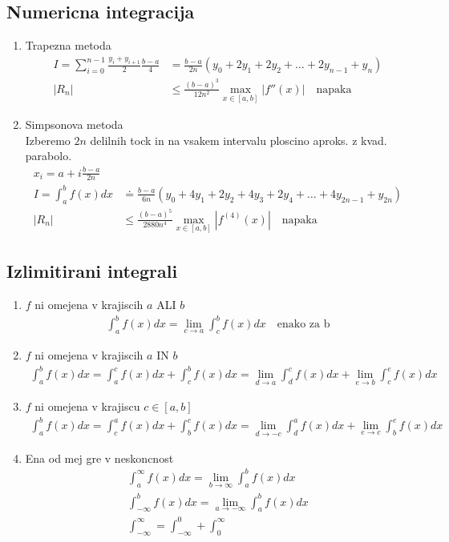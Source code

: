 \documentclass[a4paper,oneside,8pt]{extarticle}
\theoremstyle{definition}
\newcommand\abs[1]{\left|#1\right|}
\begin{document}
\begin{multicols}{2}
	\subsection*{Numericna integracija}
	\begin{enumerate}
		\item Trapezna metoda
		\begin{align*}
			I = \sum_{i=0}^{n-1} \frac{y_i +y_{i+1}}{2} \frac{b - a}{4} &= \frac{b-a}{2n} (y_0 + 2y_1 + 2y_2 + \dots + 2y_{n-1} + y_{n})\\
			\abs{R_n} &\leq \frac{(b-a)^3}{12n^2} \max_{x \in [a,b]} \abs{f''(x)} \quad \text{napaka}
		\end{align*}
		\item Simpsonova metoda\\
		Izberemo $2n$ delilnih tock in na vsakem intervalu ploscino aproks. z kvad. parabolo.
		\begin{align*}
			x_i = a + i\frac{b-a}{2n}\\
			I = \int_{a}^{b} f(x)dx &\doteq \frac{b-a}{6n} (y_0 + 4y_1 + 2y_2 + 4y_3 + 2y_4 + \dots + 4y_{2n-1} + y_{2n})\\
			\abs{R_n} &\leq \frac{(b-a)^5}{2880n^4} \max_{x \in [a,b]} \abs{f^{(4)}(x)} \quad \text{napaka}
		\end{align*}
	\end{enumerate}
%
	\subsection*{Izlimitirani integrali}
	\begin{enumerate}
		\item $f$ ni omejena v krajiscih $a$ ALI $b$
		\begin{align*}
			\int_{a}^{b} f(x)dx = \lim_{c \to a} \int_{c}^{b} f(x)dx \quad \text{enako za b}
		\end{align*}
		\item $f$ ni omejena v krajiscih $a$ IN $b$
		\begin{align*}
			\int_{a}^{b} f(x)dx = \int_{a}^{c} f(x)dx + \int_{c}^{b} f(x)dx = \lim_{d\to a} \int_{d}^{c} f(x)dx + \lim_{e\to b} \int_{c}^{e} f(x)dx  
		\end{align*}
		\item $f$ ni omejena v krajiscu $c \in [a,b]$
		\begin{align*}
			\int_{a}^{b} f(x)dx = \int_{c}^{a} f(x)dx + \int_{b}^{c} f(x)dx = \lim_{d \to -c} \int_{d}^{a} f(x)dx + \lim_{e \to c} \int_{b}^{e} f(x)dx
		\end{align*}
		\item Ena od mej gre v neskoncnost
		\begin{align*}
			\int_{a}^{\infty} f(x)dx = \lim_{b \to \infty}\int_{a}^{b} f(x)dx\\
			\int_{-\infty}^{b} f(x)dx = \lim_{a \to -\infty}\int_{a}^{b} f(x)dx\\
			\int_{-\infty}^{\infty} = \int_{-\infty}^{0} + \int_{0}^{\infty}
		\end{align*}
	\end{enumerate}
%

\end{multicols}
\end{document}
